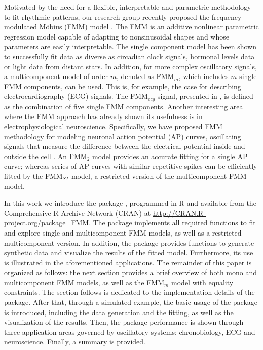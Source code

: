 Motivated by the need for a flexible, interpretable and parametric methodology to fit rhythmic patterns, our research group recently proposed the frequency modulated M\"obius (FMM) model \citep{Rueda+Larriba+Peddada:2019}. The FMM is an additive nonlinear parametric regression model capable of adapting to nonsinusoidal shapes and whose parameters are easily interpretable. The single component model has been shown to successfully fit data as diverse as circadian clock signals, hormonal levels data or light data from distant stars. In addition, for more complex oscillatory signals, a multicomponent model of order $m$, denoted as FMM$_m$, which includes $m$ single FMM components, can be used. This is, for example, the case for describing electrocardiography (ECG) signals. The FMM$_{ecg}$ signal, presented in \citet{Rueda+Larriba+Lamela:2021}, is defined as the combination of five single FMM components. Another interesting area where the FMM approach has already shown its usefulness is in electrophysiological neuroscience. Specifically, we have proposed FMM methodology for modeling neuronal action potential (AP) curves, oscillating signals that measure the difference between the electrical potential inside and outside the cell \citep[see][]{Rueda+Rodriguez+Larriba:2021, RodriguezCollado+Rueda:2021}. An FMM$_2$ model provides an accurate fitting for a single AP curve; whereas series of AP curves with similar repetitive spikes can be efficiently fitted by the FMM$_{ST}$ model, a restricted version of the multicomponent FMM model.

In this work we introduce the  package \citep{Fernandez+etal:2021}, programmed in R and available from the Comprehensive R Archive Network (CRAN) at \url{http://CRAN.R-project.org/package=FMM}. The package implements all required functions to fit and explore single and multicomponent FMM models, as well as a restricted multicomponent version. In addition, the  package provides functions to generate synthetic data and visualize the results of the fitted model. Furthermore, its use is illustrated in the aforementioned applications. The remainder of this paper is organized as follows: the next section provides a brief overview of both mono and multicomponent FMM models, as well as the FMM$_m$ model with equality constraints. The section follows is dedicated to the implementation details of the  package.  After that, through a simulated example, the basic usage of the package is introduced, including the data generation and the fitting, as well as the visualization of the results. Then, the  package performance is shown through three application areas governed by oscillatory systems: chronobiology, ECG and neuroscience. Finally, a summary is provided.


